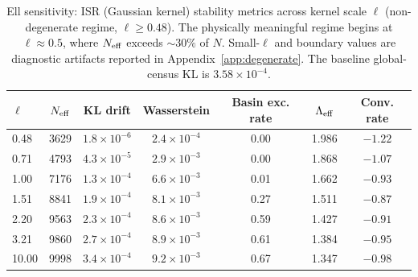 \begin{table}[t]
  \centering
  \caption{Ell sensitivity: ISR (Gaussian kernel) stability metrics across kernel scale $\ell$ (non-degenerate regime, $\ell \ge 0.48$). The physically meaningful regime begins at $\ell \approx 0.5$, where $N_{\rm eff}$ exceeds $\sim 30\%$ of $N$. Small-$\ell$ and boundary values are diagnostic artifacts reported in Appendix~\ref{app:degenerate}. The baseline global-census KL is $3.58\times10^{-4}$.}
  \label{tab:ell_sensitivity}
  \small
  \begin{tabular}{lcccccc}
    \toprule
    $\ell$ & $N_{\rm eff}$ & KL drift & Wasserstein & Basin exc. rate & $\Lambda_{\rm eff}$ & Conv. rate \\
    \midrule
    0.48 & 3629 & $1.8\times10^{-6}$ & $2.4\times10^{-4}$ & 0.00 & 1.986 & $-1.22$ \\
    0.71 & 4793 & $4.3\times10^{-5}$ & $2.9\times10^{-3}$ & 0.00 & 1.868 & $-1.07$ \\
    1.00 & 7176 & $1.3\times10^{-4}$ & $6.6\times10^{-3}$ & 0.01 & 1.662 & $-0.93$ \\
    1.51 & 8841 & $1.9\times10^{-4}$ & $8.1\times10^{-3}$ & 0.27 & 1.511 & $-0.87$ \\
    2.20 & 9563 & $2.3\times10^{-4}$ & $8.6\times10^{-3}$ & 0.59 & 1.427 & $-0.91$ \\
    3.21 & 9860 & $2.7\times10^{-4}$ & $8.9\times10^{-3}$ & 0.61 & 1.384 & $-0.95$ \\
    10.00 & 9998 & $3.4\times10^{-4}$ & $9.2\times10^{-3}$ & 0.67 & 1.347 & $-0.98$ \\
    \bottomrule
  \end{tabular}
\end{table}
